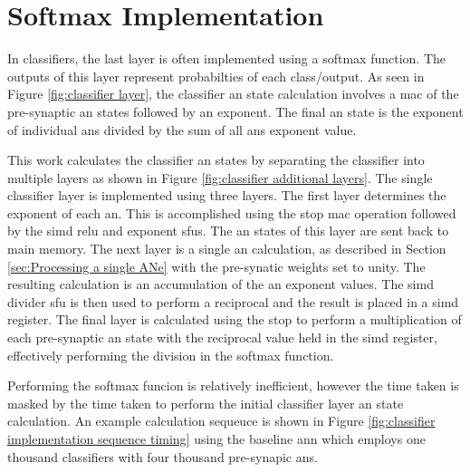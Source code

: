 
\chapter{Softmax Implementation}
\label{sec:Appendix-A}
\label{sec:Softmax Implementation}

In classifiers, the last layer is often implemented using a softmax \cite{wikipedia_softmax}\cite{stanford_softmax} function.
The outputs of this layer represent probabilties of each class/output.
As seen in Figure \ref{fig:classifier layer}, the classifier \ac{an} state calculation involves a \ac{mac} of the pre-synaptic \ac{an} states followed by an exponent.
The final \ac{an} state is the exponent of individual \acp{an} divided by the sum of all \acp{an} exponent value.

This work calculates the classifier \ac{an} states by separating the classifier into multiple layers as shown in Figure \ref{fig:classifier additional layers}.
The single classifier layer is implemented using three layers.
The first layer determines the exponent of each \ac{an}. This is accomplished using the \ac{stop} \ac{mac} operation followed by the \ac{simd} \ac{relu} and exponent \acp{sfu}.
The \ac{an} states of this layer are sent back to main memory.
The next layer is a single \ac{an} calculation, as described in Section \ref{sec:Processing a single ANe} with the pre-synatic weights set to unity.
The resulting calculation is an accumulation of the \ac{an} exponent values.
The \ac{simd} divider \ac{sfu} is then used to perform a reciprocal and the result is placed in a \ac{simd} register.
The final layer is calculated using the \ac{stop} to perform a multiplication of each pre-synaptic \ac{an} state with the reciprocal value held in the \ac{simd} register, effectively performing the division in the softmax function.

Performing the softmax funcion is relatively inefficient, however the time taken is masked by the time taken to perform the initial classifier layer \ac{an} state calculation.
An example calculation sequeuce is shown in Figure \ref{fig:classifier implementation sequence timing} using the baseline \ac{ann} which employs one thousand classifiers with four thousand pre-synapic \acp{an}.


